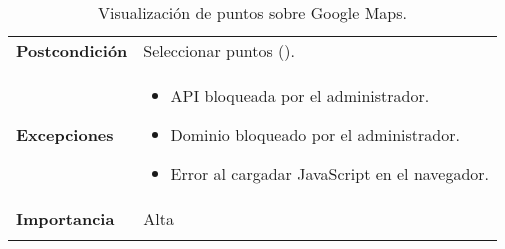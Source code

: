 \begin{longtable}[H]{@{}l|l@{}}
\begin{minipage}[t]{0.71\columnwidth}
	\end{minipage}\tabularnewline
	\midrule
	\begin{minipage}[t]{0.23\columnwidth}\raggedright\strut
		\textbf{Postcondición}\strut
	\end{minipage} & \begin{minipage}[t]{0.71\columnwidth}\raggedright\strut
		Seleccionar puntos (\nameref{cu:2.2}).\strut
	\end{minipage}\tabularnewline
	\midrule
	\begin{minipage}[t]{0.23\columnwidth}\raggedright\strut
		\textbf{Excepciones}\strut
	\end{minipage} & \begin{minipage}[t]{0.71\columnwidth}\raggedright
		\begin{itemize}
			\tightlist
			\item API bloqueada por el administrador.
			\item Dominio bloqueado por el administrador.
			\item Error al cargadar JavaScript en el navegador.
		\end{itemize}
	\end{minipage}\tabularnewline
	\midrule
	\begin{minipage}[t]{0.23\columnwidth}\raggedright\strut
		\textbf{Importancia}\strut
	\end{minipage} & \begin{minipage}[t]{0.71\columnwidth}\raggedright\strut
		Alta\strut
	\end{minipage}\tabularnewline
	\bottomrule
	\caption{Visualización de puntos sobre Google Maps.}
	\label{cu:2.1}
\end{longtable}
\newpage

